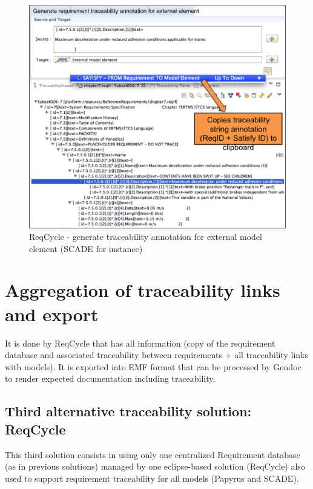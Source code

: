 \documentclass[11pt]{template/openetcs_report}
\begin{document}
\begin{figure}[tbp]
\centering
\includegraphics[width=0.9\linewidth]{images/ReqCycle_PrepareTraceLinkAnnotationForExternalElement.png}
\caption{\label{fig:ReqCycle_PrepareTraceLinkAnnotation}ReqCycle - generate traceability annotation for external model element (SCADE for instance)}
\end{figure}


\section{Aggregation of traceability links and export}
\label{sec-6-5}
It is done by ReqCycle that has all information (copy of the requirement database and associated traceability between requirements + all traceability links with models).
It is exported into EMF format that can be processed by Gendoc to render expected documentation including traceability.

\subsection{Third alternative traceability solution: ReqCycle}
\label{sec-7}
This third solution consists in using only one centralized Requirement database (as in previous solutions) managed by one eclipse-based solution (ReqCycle) also used to support requirement traceability for all models (Papyrus and SCADE).
\end{document}
